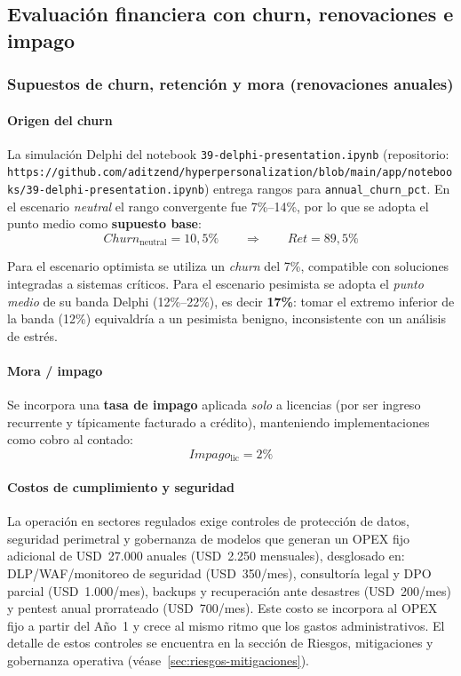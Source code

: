 \subsection{Evaluación financiera con churn, renovaciones e impago}
\label{sec:evaluacion-financiera-churn}

\subsubsection{Supuestos de churn, retención y mora (renovaciones anuales)}

\paragraph{Origen del churn}
La simulación Delphi del notebook \texttt{39-delphi-presentation.ipynb} (repositorio: \texttt{https://github.com/aditzend/hyperpersonalization/blob/main/app/notebooks/39-delphi-presentation.ipynb}) entrega rangos para \texttt{annual\_churn\_pct}. En el escenario \emph{neutral} el rango convergente fue 7\%--14\%, por lo que se adopta el punto medio como \textbf{supuesto base}:
\[
Churn_{\text{neutral}} = 10{,}5\% \qquad \Rightarrow \qquad Ret = 89{,}5\%
\]

Para el escenario optimista se utiliza un \textit{churn} del 7\%, compatible con soluciones integradas a sistemas críticos. Para el escenario pesimista se adopta el \emph{punto medio} de su banda Delphi (12\%--22\%), es decir \textbf{17\%}: tomar el extremo inferior de la banda (12\%) equivaldría a un pesimista benigno, inconsistente con un análisis de estrés.

\paragraph{Mora / impago}
Se incorpora una \textbf{tasa de impago} aplicada \emph{solo} a licencias (por ser ingreso recurrente y típicamente facturado a crédito), manteniendo implementaciones como cobro al contado:
\[
Impago_{\text{lic}} = 2\%
\]

\paragraph{Costos de cumplimiento y seguridad}
La operación en sectores regulados exige controles de protección de datos, seguridad perimetral y gobernanza de modelos que generan un OPEX fijo adicional de USD~27.000 anuales (USD~2.250 mensuales), desglosado en: DLP/WAF/monitoreo de seguridad (USD~350/mes), consultoría legal y DPO parcial (USD~1.000/mes), backups y recuperación ante desastres (USD~200/mes) y pentest anual prorrateado (USD~700/mes). Este costo se incorpora al OPEX fijo a partir del Año~1 y crece al mismo ritmo que los gastos administrativos. El detalle de estos controles se encuentra en la sección de Riesgos, mitigaciones y gobernanza operativa (véase~\ref{sec:riesgos-mitigaciones}).


